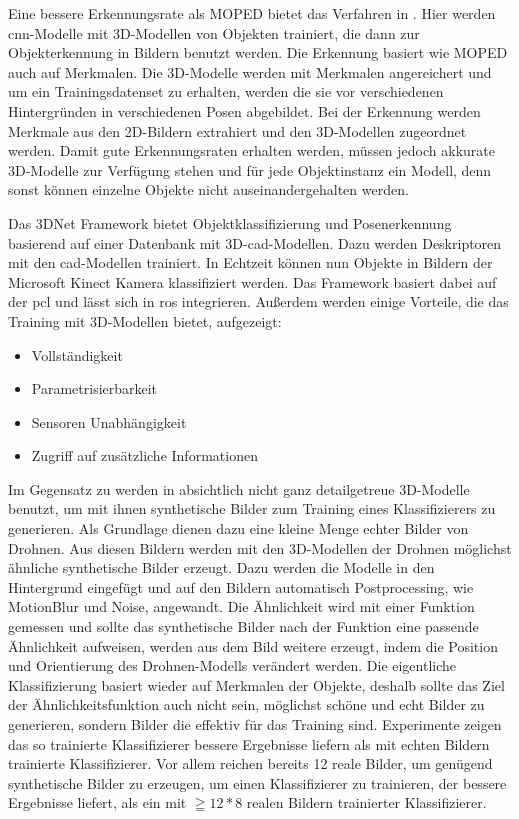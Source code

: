 Eine bessere Erkennungsrate als MOPED bietet das Verfahren in \cite{3DCNNObjRec}. Hier werden \gls{cnn}-Modelle mit 3D-Modellen von Objekten trainiert, die dann zur Objekterkennung in Bildern benutzt werden. Die Erkennung basiert wie MOPED auch auf Merkmalen. Die 3D-Modelle werden mit Merkmalen angereichert und um ein Trainingsdatenset zu erhalten, werden die sie vor verschiedenen Hintergründen in verschiedenen Posen abgebildet. Bei der Erkennung werden Merkmale aus den 2D-Bildern extrahiert und den 3D-Modellen zugeordnet werden. Damit gute Erkennungsraten erhalten werden, müssen jedoch akkurate 3D-Modelle zur Verfügung stehen und für jede Objektinstanz ein Modell, denn sonst können einzelne Objekte nicht auseinandergehalten werden.   \par

Das 3DNet Framework \cite{3dnet} bietet Objektklassifizierung und Posenerkennung basierend auf einer Datenbank mit 3D-\gls{cad}-Modellen. Dazu werden Deskriptoren mit den \gls{cad}-Modellen trainiert. In Echtzeit können nun Objekte in Bildern der Microsoft Kinect Kamera klassifiziert werden. Das Framework basiert dabei auf der \gls{pcl}\cite{pcl} und lässt sich in \acrshort{ros} integrieren. Außerdem werden einige Vorteile, die das Training mit 3D-Modellen bietet, aufgezeigt:  
\begin{itemize}
	\item Vollständigkeit
	\item Parametrisierbarkeit
	\item Sensoren Unabhängigkeit
	\item Zugriff auf zusätzliche Informationen
\end{itemize}

Im Gegensatz zu \cite{3DCNNObjRec} werden in \cite{synthImg} absichtlich nicht ganz detailgetreue 3D-Modelle benutzt, um mit ihnen synthetische Bilder zum Training eines Klassifizierers zu generieren. Als Grundlage dienen dazu eine kleine Menge echter Bilder von Drohnen. Aus diesen Bildern werden mit den 3D-Modellen der Drohnen möglichst ähnliche synthetische Bilder erzeugt. Dazu werden die Modelle in den Hintergrund eingefügt und auf den Bildern automatisch Postprocessing, wie MotionBlur und Noise, angewandt. Die Ähnlichkeit wird mit einer Funktion gemessen und sollte das synthetische Bilder nach der Funktion eine passende Ähnlichkeit aufweisen, werden aus dem Bild weitere erzeugt, indem die Position und Orientierung des Drohnen-Modells verändert werden. Die eigentliche Klassifizierung basiert wieder auf Merkmalen der Objekte, deshalb sollte das Ziel der Ähnlichkeitsfunktion auch nicht sein, möglichst schöne und echt Bilder zu generieren, sondern Bilder die effektiv für das Training sind. Experimente zeigen das so trainierte Klassifizierer bessere Ergebnisse liefern als mit echten Bildern trainierte Klassifizierer. Vor allem reichen bereits 12 reale Bilder, um genügend synthetische Bilder zu erzeugen, um einen Klassifizierer zu trainieren, der bessere Ergebnisse liefert, als ein mit $\geqq 12 * 8$ realen Bildern trainierter Klassifizierer. \par    

